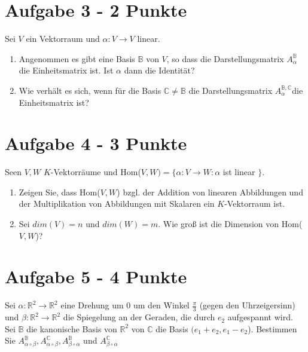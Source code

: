 \documentclass[a4paper]{article}
\begin{document}
\section*{Aufgabe 3 - 2 Punkte}
Sei $V$ ein Vektorraum und $\alpha: V \rightarrow V$ linear.
  \begin{enumerate}[label=(\alph*)]
\item Angenommen es gibt eine Basis $\mathbb{B}$ von $V$, so dass die Darstellungsmatrix $A^{\mathbb{B}}_{\alpha}$ die Einheitsmatrix ist. Ist $\alpha$ dann die Identität?
\item Wie verhält es sich, wenn für die Basis $\mathbb{C} \neq \mathbb{B}$ die Darstellungsmatrix $A^{\mathbb{B},\mathbb{C}}_{\alpha}$die Einheitsmatrix ist?
 \end{enumerate}


\section*{Aufgabe 4 - 3 Punkte}
Seen $V,W$ $K$-Vektorräume und Hom($V,W) = \{\alpha: V \rightarrow W: \alpha$ ist linear $\}$.

  \begin{enumerate}[label=(\alph*)]
  \item Zeigen Sie, dass Hom($V,W$) bzgl. der Addition von linearen Abbildungen und der Multiplikation von Abbildungen mit Skalaren ein $K$-Vektorraum ist.
  \item Sei $dim(V) = n$ und $dim(W) = m$. Wie groß ist die Dimension von Hom($V,W$)?
  
  \end{enumerate}
 
 \section*{Aufgabe 5 - 4 Punkte}
Sei $\alpha: \mathbb{R}^2 \rightarrow \mathbb{R}^2$ eine Drehung um 0 um den Winkel $\frac{\pi}{3}$ (gegen den Uhrzeigersinn) und $\beta: \mathbb{R}^2 \rightarrow \mathbb{R}^2$ die Spiegelung an der Geraden, die durch $e_2$ aufgespannt wird. Sei $\mathbb{B}$ die kanonische Basis von $\mathbb{R}^2$ von $\mathbb{C}$ die Basis $(e_1 + e_2, e_1 - e_2$). Bestimmen Sie $A^{\mathbb{B}}_{\alpha \circ \beta}, A^{\mathbb{C}}_{\alpha \circ \beta},A^{\mathbb{B}}_{\beta \circ \alpha}$ und $A^{\mathbb{C}}_{\beta \circ \alpha}$
\end{document}
